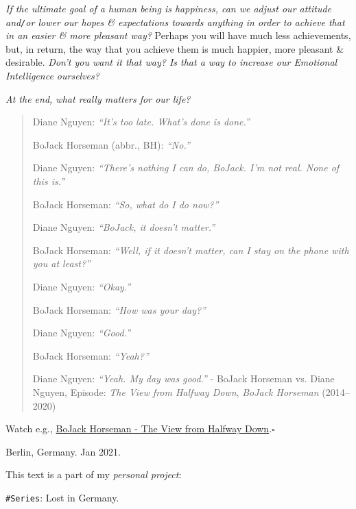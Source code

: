 \documentclass[12pt,twoside]{book}
\begin{document}
{\it If the ultimate goal of a human being is happiness, can we adjust our attitude and{\tt/}or lower our hopes \& expectations towards anything in order to achieve that in an easier \& more pleasant way?} Perhaps you will have much less achievements, but, in return, the way that you achieve them is much happier, more pleasant \& desirable. {\it Don't you want it that way? Is that a way to increase our Emotional Intelligence ourselves?}

{\it At the end, what really matters for our life?}
\begin{quote}
	{\sf Diane Nguyen}: {\it ``It's too late. What's done is done.''}
	
	{\sf BoJack Horseman} (abbr., BH): {\it ``No.''}
	
	{\sf Diane Nguyen}: {\it ``There's nothing I can do, BoJack. I'm not real. None of this is.''}
	
	{\sf BoJack Horseman}: {\it ``So, what do I do now?''}
	
	{\sf Diane Nguyen}: {\it ``BoJack, it doesn't matter.''}
	
	{\sf BoJack Horseman}: {\it ``Well, if it doesn't matter, can I stay on the phone with you at least?''}
	
	{\sf Diane Nguyen}: {\it ``Okay.''}
	
	{\sf BoJack Horseman}: {\it ``How was your day?''}
	
	{\sf Diane Nguyen}: {\it ``Good.''}
	
	{\sf BoJack Horseman}: {\it ``Yeah?''}
	
	{\sf Diane Nguyen}: {\it ``Yeah. My day was good.''} - BoJack Horseman vs. Diane Nguyen,  Episode: {\it The View from Halfway Down}, {\it BoJack Horseman} (2014--2020)
\end{quote}
Watch e.g., \href{https://www.youtube.com/watch?v=Pt21dU5Pu8g}{BoJack Horseman - The View from Halfway Down}.\hfill$\square$

\begin{flushright}
	{\sc Berlin, Germany}. Jan 2021.
	
	This text is a part of my {\it personal project}: 
	
	{\tt \#Series}: {\sc Lost in Germany}.
\end{flushright}
\end{document}
